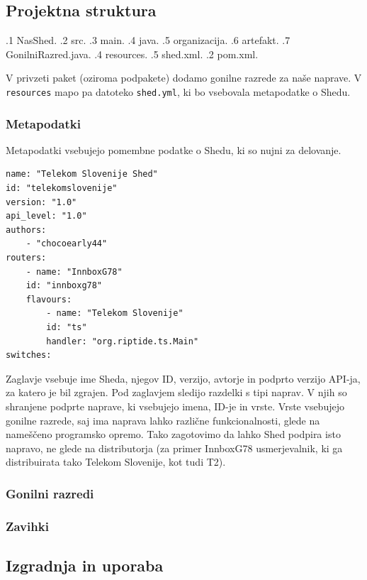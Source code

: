 \documentclass[12pt]{article}
\begin{document}
\subsection{Projektna struktura} \label{projektna-struktura}
\begin{dirtree}{%
.1 NasShed.
	.2 src.
		.3 main.
			.4 java.
				.5 organizacija.
					.6 artefakt.
						.7 GonilniRazred.java.
			.4 resources.
				.5 shed.xml.
	.2 pom.xml.
}
\end{dirtree}
\vspace*{12pt}
V privzeti paket (oziroma podpakete) dodamo gonilne razrede za naše naprave.
V \texttt{resources} mapo pa datoteko \texttt{shed.yml}, ki bo vsebovala
metapodatke o Shedu.

\subsubsection{Metapodatki}
Metapodatki vsebujejo pomembne podatke o Shedu, ki so nujni za delovanje.

\begin{lstlisting}[style=XmlStyle]
name: "Telekom Slovenije Shed"
id: "telekomslovenije"
version: "1.0"
api_level: "1.0"
authors:
	- "chocoearly44"
routers:
	- name: "InnboxG78"
	id: "innboxg78"
	flavours:
		- name: "Telekom Slovenije"
		id: "ts"
		handler: "org.riptide.ts.Main"
switches:
\end{lstlisting}
Zaglavje vsebuje ime Sheda, njegov ID, verzijo, avtorje in podprto verzijo
API-ja, za katero je bil zgrajen. Pod zaglavjem sledijo razdelki s tipi
naprav. V njih so shranjene podprte naprave, ki vsebujejo imena, ID-je in
vrste. Vrste vsebujejo gonilne razrede, saj ima naprava lahko različne
funkcionalnosti, glede na nameščeno programsko opremo. Tako zagotovimo
da lahko Shed podpira isto napravo, ne glede na distributorja (za primer
InnboxG78 usmerjevalnik, ki ga distribuirata tako Telekom Slovenije, kot
tudi T2).

\subsubsection{Gonilni razredi}


\subsubsection{Zavihki}
\subsection{Izgradnja in uporaba}
\newpage
\end{document}
